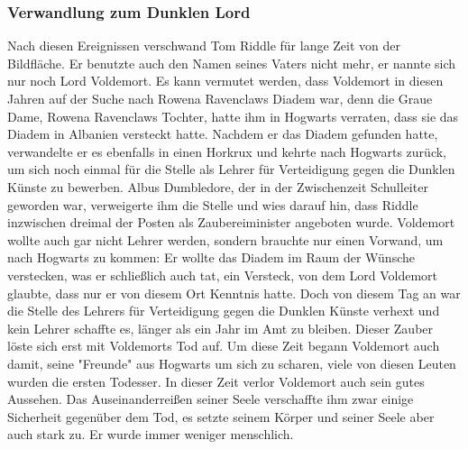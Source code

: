 \documentclass[a4paper, 10pt]{article}
\begin{document}
\subsubsection*{\large Verwandlung zum Dunklen Lord}
Nach diesen Ereignissen verschwand Tom Riddle für lange Zeit von der Bildfläche. Er benutzte auch den Namen seines Vaters nicht mehr, er nannte sich nur noch Lord Voldemort. Es kann vermutet werden, dass Voldemort in diesen Jahren auf der Suche nach Rowena Ravenclaws Diadem war, denn die Graue Dame, Rowena Ravenclaws Tochter, hatte ihm in Hogwarts verraten, dass sie das Diadem in Albanien versteckt hatte.
\vspace{10pt}
\newline
Nachdem er das Diadem gefunden hatte, verwandelte er es ebenfalls in einen Horkrux und kehrte nach Hogwarts zurück, um sich noch einmal für die Stelle als Lehrer für Verteidigung gegen die Dunklen Künste zu bewerben. Albus Dumbledore, der in der Zwischenzeit Schulleiter geworden war, verweigerte ihm die Stelle und wies darauf hin, dass Riddle inzwischen dreimal der Posten als Zaubereiminister angeboten wurde. Voldemort wollte auch gar nicht Lehrer werden, sondern brauchte nur einen Vorwand, um nach Hogwarts zu kommen: Er wollte das Diadem im Raum der Wünsche verstecken, was er schließlich auch tat, ein Versteck, von dem Lord Voldemort glaubte, dass nur er von diesem Ort Kenntnis hatte. Doch von diesem Tag an war die Stelle des Lehrers für Verteidigung gegen die Dunklen Künste verhext und kein Lehrer schaffte es, länger als ein Jahr im Amt zu bleiben. Dieser Zauber löste sich erst mit Voldemorts Tod auf.
\vspace{10pt}
\newline
Um diese Zeit begann Voldemort auch damit, seine "Freunde" aus Hogwarts um sich zu scharen, viele von diesen Leuten wurden die ersten Todesser.
\vspace{10pt}
\newline
In dieser Zeit verlor Voldemort auch sein gutes Aussehen. Das Auseinanderreißen seiner Seele verschaffte ihm zwar einige Sicherheit gegenüber dem Tod, es setzte seinem Körper und seiner Seele aber auch stark zu. Er wurde immer weniger menschlich.
\end{document}
